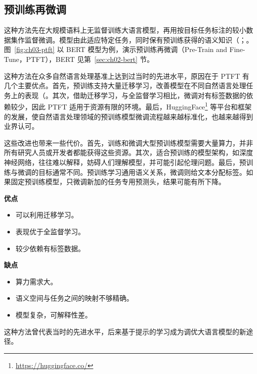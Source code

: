 \subsection{预训练再微调}
这种方法先在大规模语料上无监督训练大语言模型，再用按目标任务标注的较小数据集作监督微调。模型由此适应特定任务，同时保有预训练获得的语义知识（；。图~\ref{fig:ch03-ptft} 以 BERT 模型为例，演示预训练再微调（Pre-Train and Fine-Tune，PTFT），BERT 见第~\ref{sec:ch02-bert} 节。


这种方法在众多自然语言处理基准上达到过当时的先进水平，原因在于 PTFT 有几个主要优点。首先，预训练支持大量迁移学习，改善模型在不同自然语言处理任务上的表现（。其次，借助迁移学习，与全监督学习相比，微调对有标签数据的依赖较少，因此 PTFT 适用于资源有限的环境。最后，HuggingFace\footnote{\url{https://huggingface.co/}} 等平台和框架的发展，使自然语言处理领域的预训练模型微调流程越来越标准化，也越来越得到业界认可。

这些改进也带来一些代价。首先，训练和微调大型预训练模型需要大量算力，并非所有研究人员或开发者都能获得这些资源。其次，适合预训练的模型架构，如深度神经网络，往往难以解释，妨碍人们理解模型，并可能引起伦理问题。最后，预训练与微调的目标通常不同。预训练学习通用语义关系，微调则给文本分配标签。如果固定预训练模型，只微调新加的任务专用预测头，结果可能有所下降。

\begin{keypoint}
\noindent\textbf{优点}
\begin{itemize}
\item 可以利用迁移学习。
\item 表现优于全监督学习。
\item 较少依赖有标签数据。
\end{itemize}
\noindent\textbf{缺点}
\begin{itemize}
\item 算力需求大。
\item 语义空间与任务之间的映射不够精确。
\item 模型复杂，可解释性差。
\end{itemize}
\end{keypoint}

这种方法曾代表当时的先进水平，后来基于提示的学习成为调优大语言模型的新途径。

